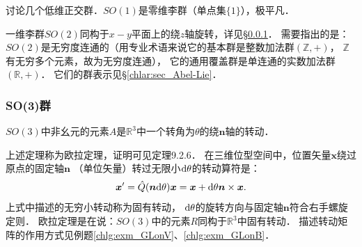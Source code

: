 讨论几个低维正交群．$SO(1)$是零维李群（单点集$\{1\}$），极平凡．


一维李群$SO(2)$同构于$x-y$平面上的绕$z$轴旋转，详见\S\ref{chlg:sec_rotation}．
需要指出的是：$SO(2)$是无穷度连通的（用专业术语来说它的基本群是整数加法群$(\mathbb{Z},+)$，
$\mathbb{Z}$有无穷多个元素，故为无穷度连通），
它的通用覆盖群是单连通的实数加法群$(\mathbb{R},+)$．
它们的群表示见\S\ref{chlar:sec_Abel-Lie}．



\subsubsection{SO(3)群}\label{chlg:sec_rotation}

\begin{theorem}\label{chlg:thm_Euler}
    $SO(3)$中非幺元的元素$A$是$\mathbb{R}^3$中一个转角为$\theta$的绕$\boldsymbol{n}$轴的转动．
\end{theorem}
上述定理称为欧拉定理，证明可见\parencite{marsden-1999-IMS}定理9.2.6．
在三维位型空间中，位置矢量$\boldsymbol{x}$绕过原点的固定轴$\boldsymbol{n}$
（单位矢量）转过无限小${\rm d}\theta$的转动算符是：
\begin{equation}\label{chlg:eqn_rot-inf}
    \boldsymbol{x}' = \hat{Q}(\boldsymbol{n}{\rm d}\theta) \boldsymbol{x} 
    = \boldsymbol{x} +  {\rm d}\theta\boldsymbol{n}\times \boldsymbol{x} .
\end{equation}
上式中描述的无穷小转动称为{\heiti 固有转动}，
${\rm d}\theta$的旋转方向与固定轴$\boldsymbol{n}$符合右手螺旋定则．
欧拉定理是在说：$SO(3)$中的元素$R$同构于$\mathbb{R}^3$中固有转动．
描述转动矩阵的作用方式见例题\ref{chlg:exm_GLonV}、\ref{chlg:exm_GLonB}．


